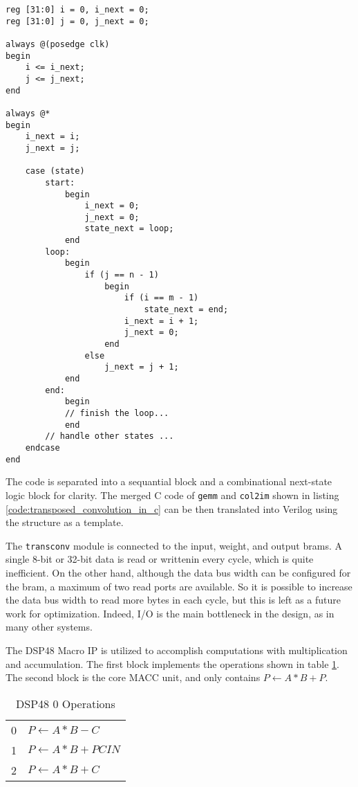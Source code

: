 \begin{itemize}
\begin{code}
\begin{verbatim}
reg [31:0] i = 0, i_next = 0;
reg [31:0] j = 0, j_next = 0;

always @(posedge clk)
begin
    i <= i_next;
    j <= j_next;
end

always @*
begin
    i_next = i;
    j_next = j;

    case (state)
        start:
            begin
                i_next = 0;
                j_next = 0;
                state_next = loop;
            end
        loop:
            begin
                if (j == n - 1)
                    begin
                        if (i == m - 1)
                            state_next = end;
                        i_next = i + 1;
                        j_next = 0;
                    end
                else
                    j_next = j + 1;
            end
        end:
            begin
            // finish the loop...
            end
        // handle other states ...
    endcase
end
\end{verbatim}
\label{code:simple_for_verilog}
\end{code}

The code is separated into a sequantial block and a combinational next-state logic block for clarity.
The merged C code of \texttt{gemm} and \texttt{col2im} shown in listing
\ref{code:transposed_convolution_in_c} can be then translated into Verilog using the structure
as a template.

The \texttt{transconv} module is connected to the input, weight, and output \glspl{bram}. A single
8-bit or 32-bit data is read or writtenin every cycle, which is quite inefficient. On the other hand,
although the data bus width can be configured for the \gls{bram}, a maximum of two read ports are available.
So it is possible to increase the data bus width to read more bytes in each cycle, but this is left
as a future work for optimization. Indeed, I/O is the main bottleneck in the design, as in many other systems.

The DSP48 Macro IP is utilized to accomplish computations with multiplication and accumulation. The first
block implements the operations shown in table \ref{table:dsp48_0_operations}. The second block is the core
MACC unit, and only contains $P \leftarrow A*B+P$.

\begin{table}[h]
  \centering
  \caption{DSP48 0 Operations}
  \begin{tabular}{l | l}
    0 & $P \leftarrow A*B-C$ \\
    1 & $P \leftarrow A*B+PCIN$ \\
    2 & $P \leftarrow A*B+C$
  \end{tabular}
  \label{table:dsp48_0_operations}
\end{table}


\end{itemize}
